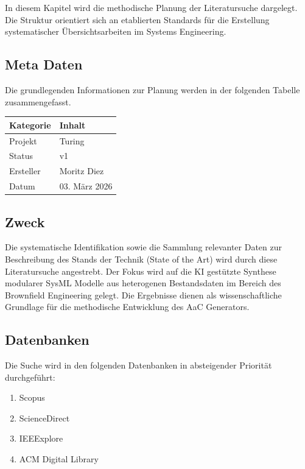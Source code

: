 
In diesem Kapitel wird die methodische Planung der Literatursuche dargelegt. Die Struktur orientiert sich an etablierten Standards für die Erstellung systematischer Übersichtsarbeiten im Systems Engineering.

\subsection{Meta Daten}

Die grundlegenden Informationen zur Planung werden in der folgenden Tabelle zusammengefasst.

\begin{table}[h]
\centering
\begin{tabular}{|l|l|}
\hline
\textbf{Kategorie} & \textbf{Inhalt} \\ \hline
Projekt & Turing \\ \hline
Status & v1 \\ \hline
Ersteller & Moritz Diez \\ \hline
Datum & 03. März 2026 \\ \hline
\end{tabular}
\end{table}

\subsection{Zweck}

Die systematische Identifikation sowie die Sammlung relevanter Daten zur Beschreibung des Stands der Technik (State of the Art) wird durch diese Literatursuche angestrebt. Der Fokus wird auf die KI gestützte Synthese modularer SysML Modelle aus heterogenen Bestandsdaten im Bereich des Brownfield Engineering gelegt. Die Ergebnisse dienen als wissenschaftliche Grundlage für die methodische Entwicklung des AaC Generators.

\subsection{Datenbanken}

Die Suche wird in den folgenden Datenbanken in absteigender Priorität durchgeführt:
\begin{enumerate}
    \item Scopus
    \item ScienceDirect
    \item IEEExplore
    \item ACM Digital Library
\end{enumerate}

